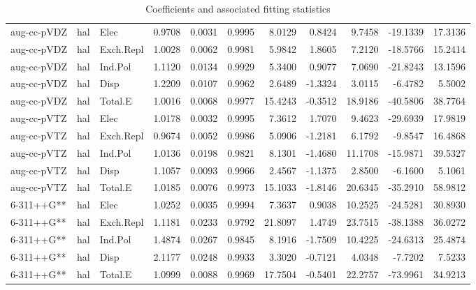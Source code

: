 \begin{table}[ht]
\begin{tabular}{lllrrrrrrrr}
  aug-cc-pVDZ & hal & Elec & 0.9708 & 0.0031 & 0.9995 & 8.0129 & 0.8424 & 9.7458 & -19.1339 & 17.3136 \\ 
  aug-cc-pVDZ & hal & Exch.Repl & 1.0028 & 0.0062 & 0.9981 & 5.9842 & 1.8605 & 7.2120 & -18.5766 & 15.2414 \\ 
  aug-cc-pVDZ & hal & Ind.Pol & 1.1120 & 0.0134 & 0.9929 & 5.3400 & 0.9077 & 7.0690 & -21.8243 & 13.1596 \\ 
  aug-cc-pVDZ & hal & Disp & 1.2209 & 0.0107 & 0.9962 & 2.6489 & -1.3324 & 3.0115 & -6.4782 & 5.5002 \\ 
  aug-cc-pVDZ & hal & Total.E & 1.0016 & 0.0068 & 0.9977 & 15.4243 & -0.3512 & 18.9186 & -40.5806 & 38.7764 \\ 
  aug-cc-pVTZ & hal & Elec & 1.0178 & 0.0032 & 0.9995 & 7.3612 & 1.7070 & 9.4623 & -29.6939 & 17.9819 \\ 
  aug-cc-pVTZ & hal & Exch.Repl & 0.9674 & 0.0052 & 0.9986 & 5.0906 & -1.2181 & 6.1792 & -9.8547 & 16.4868 \\ 
  aug-cc-pVTZ & hal & Ind.Pol & 1.0136 & 0.0198 & 0.9821 & 8.1301 & -1.4680 & 11.1708 & -15.9871 & 39.5327 \\ 
  aug-cc-pVTZ & hal & Disp & 1.1057 & 0.0093 & 0.9966 & 2.4567 & -1.1375 & 2.8500 & -6.1600 & 5.1061 \\ 
  aug-cc-pVTZ & hal & Total.E & 1.0185 & 0.0076 & 0.9973 & 15.1033 & -1.8146 & 20.6345 & -35.2910 & 58.9812 \\ 
  6-311++G** & hal & Elec & 1.0252 & 0.0035 & 0.9994 & 7.3637 & 0.9038 & 10.2525 & -24.5281 & 30.8930 \\ 
  6-311++G** & hal & Exch.Repl & 1.1181 & 0.0233 & 0.9792 & 21.8097 & 1.4749 & 23.7515 & -38.1388 & 36.0272 \\ 
  6-311++G** & hal & Ind.Pol & 1.4874 & 0.0267 & 0.9845 & 8.1916 & -1.7509 & 10.4225 & -24.6313 & 25.4874 \\ 
  6-311++G** & hal & Disp & 2.1177 & 0.0248 & 0.9933 & 3.3020 & -0.7121 & 4.0348 & -7.7202 & 7.5233 \\ 
  6-311++G** & hal & Total.E & 1.0999 & 0.0088 & 0.9969 & 17.7504 & -0.5401 & 22.2757 & -73.9961 & 34.9213 \\ 
   \hline
\end{tabular}
    \caption{Coefficients and associated fitting statistics}
    \label{tab:coef_indiv}
\end{table}


